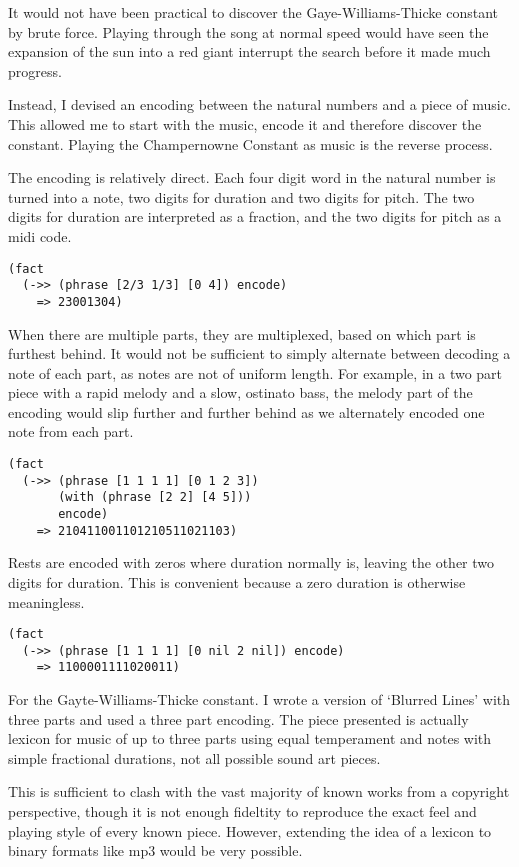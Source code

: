 \documentclass[numbers]{sigplanconf}
\begin{document}
It would not have been practical to discover the Gaye-Williams-Thicke constant by brute force. Playing through the song at normal
speed would have seen the expansion of the sun into a red giant interrupt the search before it made much progress.

Instead, I devised an encoding between the natural numbers and a piece of music. This allowed me to start with the music, encode
it and therefore discover the constant. Playing the Champernowne Constant as music is the reverse process.

The encoding is relatively direct. Each four digit word in the natural number is turned into a note, two digits for duration and
two digits for pitch. The two digits for duration are interpreted as a fraction, and the two digits for pitch as a midi code.

\begin{verbatim}
(fact
  (->> (phrase [2/3 1/3] [0 4]) encode)
    => 23001304)
\end{verbatim}

When there are multiple parts, they are multiplexed, based on which part is furthest behind. It would not be sufficient to
simply alternate between decoding a note of each part, as notes are not of uniform length. For example, in a two part piece
with a rapid melody and a slow, ostinato bass, the melody part of the encoding would slip further and further behind as
we alternately encoded one note from each part.

\begin{verbatim}
(fact
  (->> (phrase [1 1 1 1] [0 1 2 3])
       (with (phrase [2 2] [4 5]))
       encode)
    => 210411001101210511021103)
\end{verbatim}

Rests are encoded with zeros where duration normally is, leaving the other two digits for duration.
This is convenient because a zero duration is otherwise meaningless.

\begin{verbatim}
(fact
  (->> (phrase [1 1 1 1] [0 nil 2 nil]) encode)
    => 1100001111020011)
\end{verbatim}

For the Gayte-Williams-Thicke constant. I wrote a version of `Blurred Lines' with three parts and used a three part encoding.
The piece presented is actually lexicon for music of up to three parts using equal temperament and notes with simple
fractional durations, not all possible sound art pieces.

This is sufficient to clash with the vast majority of known works from a copyright perspective, though
it is not enough fideltity to reproduce the exact feel and playing style of every known piece. However, extending the idea of
a lexicon to binary formats like mp3 would be very possible.
\end{document}
